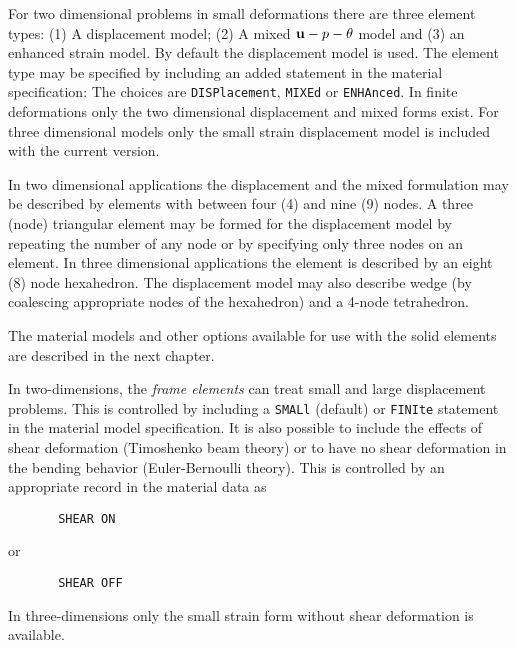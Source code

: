 For two dimensional problems in small deformations there are three
element types: (1) A displacement model; (2) A mixed $\mathbf{u}-p-\theta$ model
and (3) an enhanced strain model.  By default the displacement model is used.
The element type may be specified by including an added statement in
the material specification: The choices are \texttt{DISPlacement},
\texttt{MIXEd} or \texttt{ENHAnced}.
In finite deformations only the two dimensional displacement and mixed forms
exist.  For three dimensional models only the small strain displacement model
is included with the current version.

In two dimensional applications
the displacement and the mixed formulation may be described by elements
with between four (4) and nine (9) nodes.
A three (node) triangular element
may be formed for the displacement model by repeating the number of any
node or by specifying only three nodes on an element.
In three dimensional applications the element is described by an eight (8)
node hexahedron.  The displacement model may also describe wedge
(by coalescing appropriate nodes of the hexahedron) and a 4-node tetrahedron.

The material models and other options
available for use with the solid elements are described in the next chapter.

In two-dimensions, the {\it frame elements} can treat small and large
displacement problems.  This is controlled by including a \texttt{SMALl} (default) or \texttt{FINIte} statement in the material model specification.  It is also
possible to include the effects of shear deformation (Timoshenko beam theory)
or to have no shear deformation in the bending behavior (Euler-Bernoulli
theory).  This is controlled by an appropriate record in the material
data as 
\begin{verbatim}
       SHEAR ON
\end{verbatim}
or
\begin{verbatim}
       SHEAR OFF
\end{verbatim}
In three-dimensions only the small strain form without shear deformation is
available.

